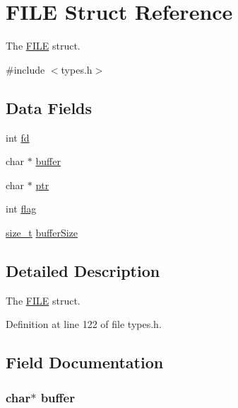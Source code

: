 \hypertarget{struct_f_i_l_e}{
\section{FILE Struct Reference}
\label{struct_f_i_l_e}
}


The \hyperlink{struct_f_i_l_e}{FILE} struct.  




{\ttfamily \#include $<$types.h$>$}

\subsection*{Data Fields}
\begin{DoxyCompactItemize}
\item 
int \hyperlink{struct_f_i_l_e_a6f8059414f0228f0256115e024eeed4b}{fd}
\item 
char $\ast$ \hyperlink{struct_f_i_l_e_aff2566f4c366b48d73479bef43ee4d2e}{buffer}
\item 
char $\ast$ \hyperlink{struct_f_i_l_e_a935adc2e417a61d7eb6f04efb18ba031}{ptr}
\item 
int \hyperlink{struct_f_i_l_e_adf916204820072417ed73a32de1cefcf}{flag}
\item 
\hyperlink{types_8h_a7b60c5629e55e8ec87a4547dd4abced4}{size\_\-t} \hyperlink{struct_f_i_l_e_a7be887a2ca0a258cf6b368d32fd87487}{bufferSize}
\end{DoxyCompactItemize}


\subsection{Detailed Description}
The \hyperlink{struct_f_i_l_e}{FILE} struct. 

Definition at line 122 of file types.h.



\subsection{Field Documentation}
\hypertarget{struct_f_i_l_e_aff2566f4c366b48d73479bef43ee4d2e}{
\subsubsection[{buffer}]{\setlength{\rightskip}{0pt plus 5cm}char$\ast$ {\bf buffer}}}
\label{struct_f_i_l_e_aff2566f4c366b48d73479bef43ee4d2e}


